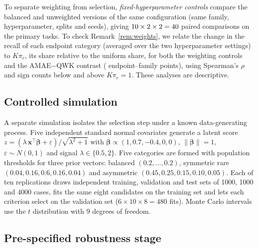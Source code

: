 \documentclass[pdflatex,sn-mathphys-ay]{sn-jnl}
\theoremstyle{thmstyleone}
\theoremstyle{thmstylethree}
\begin{document}
To separate weighting from selection, \emph{fixed-hyperparameter controls} compare the balanced and unweighted versions of the same configuration (same family, hyperparameter, splits and seeds), giving $10\times2\times2=40{}$ paired comparisons on the primary tasks. To check Remark~\ref{rem:weights}, we relate the change in the recall of each endpoint category (averaged over the two hyperparameter settings) to $K\pi_c$, its share relative to the uniform share, for both the weighting controls and the AMAE$-$QWK contrast (\EpWPoints{} endpoint--family points), using Spearman's $\rho$ and sign counts below and above $K\pi_c=1$. These analyses are descriptive.

\subsection{Controlled simulation}\label{sec:sim}

A separate simulation isolates the selection step under a known data-generating process. Five independent standard normal covariates generate a latent score $z=(\lambda\,\mathbf{x}^\top\boldsymbol\beta+\varepsilon)/\sqrt{\lambda^2+1}$ with $\boldsymbol\beta\propto(1,0.7,-0.4,0,0)$, $\|\boldsymbol\beta\|=1$, $\varepsilon\sim N(0,1)$ and signal $\lambda\in\{0.5,2\}$. Five categories are formed with population thresholds for three prior vectors: balanced $(0.2,\dots,0.2)$, symmetric rare $(0.04,0.16,0.6,0.16,0.04)$ and asymmetric $(0.45,0.25,0.15,0.10,0.05)$. Each of ten replications draws independent training, validation and test sets of 1000, 1000 and 4000 cases, fits the same eight candidates on the training set and lets each criterion select on the validation set ($6\times10\times8=480$ fits). Monte Carlo intervals use the $t$ distribution with 9 degrees of freedom.

\subsection{Pre-specified robustness stage}\label{sec:stage4}
\end{document}
